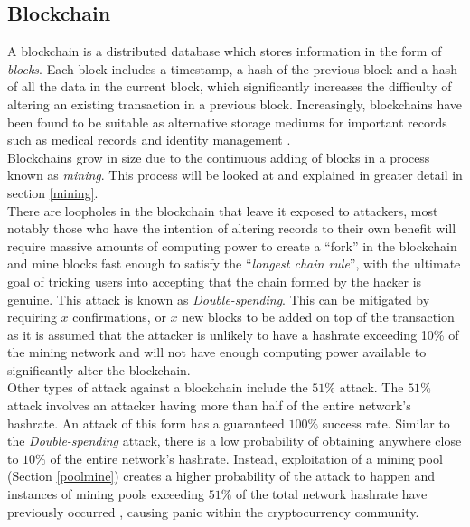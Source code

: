 \documentclass[a4paper,12pt]{article}
\begin{document}
{	\subsection{Blockchain}
	{\par \noindent A blockchain is a distributed database which stores information in the form of \textit{blocks}. Each block includes a timestamp, a hash of the previous block and a hash of all the data in the current block, which significantly increases the difficulty of altering an existing transaction in a previous block. Increasingly,  blockchains have been found to be suitable as alternative storage mediums for important records such as medical records \cite{medrec} and identity management \cite{idenmgmtdhs,idenmgmtmsft}.
		\\
		\newline 
		Blockchains grow in size due to the continuous adding of blocks in a process known as \textit{mining}. This process will be looked at and explained in greater detail in section \ref{mining}.
		\\\newline
	There are loopholes in the blockchain that leave it exposed to attackers, most notably those who have the intention of altering records to their own benefit will require massive amounts of computing power to create a ``fork'' in the blockchain and mine blocks fast enough to satisfy the ``\textit{longest chain rule}'', with the ultimate goal of tricking users into accepting that the chain formed by the hacker is genuine. This attack is known as \textit{Double-spending}. This can be mitigated by requiring $x$ confirmations, or $x$ new blocks to be added on top of the transaction as it is assumed that the attacker is unlikely to have a hashrate exceeding 10\% of the mining network and will not have enough computing power available to significantly alter the blockchain.
		\\\newline
		Other types of attack against a blockchain include the $51\%$ attack. The $51\%$ attack involves an attacker having more than half of the entire network's hashrate. An attack of this form has a guaranteed $100\%$ success rate. Similar to the \textit{Double-spending} attack, there is a low probability of obtaining anywhere close to $10\%$ of the entire network's hashrate. Instead, exploitation of a mining pool (Section \ref{poolmine}) creates a higher probability of the attack to happen and instances of mining pools exceeding $51\%$ of the total network hashrate have previously occurred \cite{51}, causing panic within the cryptocurrency community.
		\\\newline
	}
}
\end{document}
